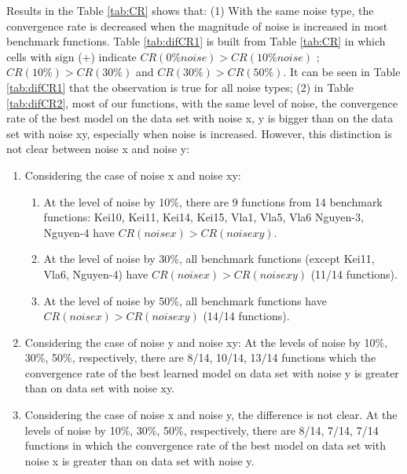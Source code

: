 Results in the Table \ref{tab:CR} shows that: (1) With the same noise type, the convergence rate is decreased when the magnitude of noise is increased in most benchmark functions. Table \ref{tab:difCR1} is built from Table \ref{tab:CR} in which cells with sign (+) indicate $CR(0\% noise) > CR(10\% noise)$ ;$ CR(10\%) > CR(30\%)$ and $ CR(30\%) > CR(50\%)$. It can be seen in Table \ref{tab:difCR1} that the observation is true for all noise types; (2) in Table \ref{tab:difCR2}, most of our functions, with the same level of noise, the convergence rate of the best model on the data set with noise x, y is bigger than on the data set with noise xy, especially when noise is increased. However, this distinction is not clear between noise x and noise y:
\begin{enumerate}
\item Considering the case of noise x and noise xy:
\begin{enumerate}
\item At the level of noise by 10\%, there are 9 functions from 14 benchmark functions: Kei10, Kei11, Kei14, Kei15, Vla1, Vla5, Vla6 Nguyen-3, Nguyen-4 have $CR(noise x) > CR(noise xy)$.
\item At the level of noise by 30\%, all benchmark  functions  (except Kei11, Vla6, Nguyen-4) have $CR(noise x) > CR(noise xy)$ (11/14 functions).
\item At the level of noise by 50\%, all benchmark  functions have $ CR(noise x) > CR(noise xy)$ (14/14 functions).
\end{enumerate}
\item Considering the case of noise y and noise xy: At the levels of noise by 10\%, 30\%, 50\%, respectively, there are 8/14, 10/14, 13/14 functions which the convergence rate of the best learned model on data set with noise y is greater than on data set with noise xy.
\item Considering the case of noise x and noise y, the difference is not clear. At the levels of noise by 10\%, 30\%, 50\%, respectively, there are 8/14, 7/14, 7/14 functions in which the convergence rate of the best model on data set with noise x is greater than on data set with noise y.
\end{enumerate} \par


